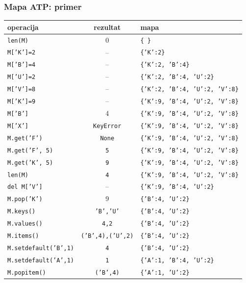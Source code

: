 \documentclass[compress]{beamer}
\begin{document}
\begin{frame}
  \frametitle{Mapa ATP: primer}
  \begin{center}
    \begin{tabular}{lcl}
      \textbf{operacija} & \textbf{rezultat} & \textbf{mapa} \\ \hline
      \texttt{len(M)} & 0 & \texttt{\{ \}} \\
      \texttt{M['K']=2} & -- & \texttt{\{'K':2\}} \\
      \texttt{M['B']=4} & -- & \texttt{\{'K':2, 'B':4\}} \\
      \texttt{M['U']=2} & -- & \texttt{\{'K':2, 'B':4, 'U':2\}} \\
      \texttt{M['V']=8} & -- & \texttt{\{'K':2, 'B':4, 'U':2, 'V':8\}} \\
      \texttt{M['K']=9} & -- & \texttt{\{'K':9, 'B':4, 'U':2, 'V':8\}} \\
      \texttt{M['B']} & 4 & \texttt{\{'K':9, 'B':4, 'U':2, 'V':8\}} \\
      \texttt{M['X']} & \texttt{KeyError} & \texttt{\{'K':9, 'B':4, 'U':2, 'V':8\}} \\
      \texttt{M.get('F')} & \texttt{None} & \texttt{\{'K':9, 'B':4, 'U':2, 'V':8\}} \\
      \texttt{M.get('F', 5)} & \texttt{5} & \texttt{\{'K':9, 'B':4, 'U':2, 'V':8\}} \\
      \texttt{M.get('K', 5)} & \texttt{9} & \texttt{\{'K':9, 'B':4, 'U':2, 'V':8\}} \\
      \texttt{len(M)} & \texttt{4} & \texttt{\{'K':9, 'B':4, 'U':2, 'V':8\}} \\
      \texttt{del M['V']} & -- & \texttt{\{'K':9, 'B':4, 'U':2\}} \\
      \texttt{M.pop('K')} & 9 & \texttt{\{'B':4, 'U':2\}} \\
      \texttt{M.keys()} & \texttt{'B','U'} & \texttt{\{'B':4, 'U':2\}} \\
      \texttt{M.values()} & \texttt{4,2} & \texttt{\{'B':4, 'U':2\}} \\
      \texttt{M.items()} & \texttt{('B',4),('U',2)} & \texttt{\{'B':4, 'U':2\}} \\
      \texttt{M.setdefault('B',1)} & \texttt{4} & \texttt{\{'B':4, 'U':2\}} \\
      \texttt{M.setdefault('A',1)} & \texttt{1} & \texttt{\{'A':1, 'B':4, 'U':2\}} \\
      \texttt{M.popitem()} & \texttt{('B',4)} & \texttt{\{'A':1, 'U':2\}}
    \end{tabular}
  \end{center}
\end{frame}
\end{document}
